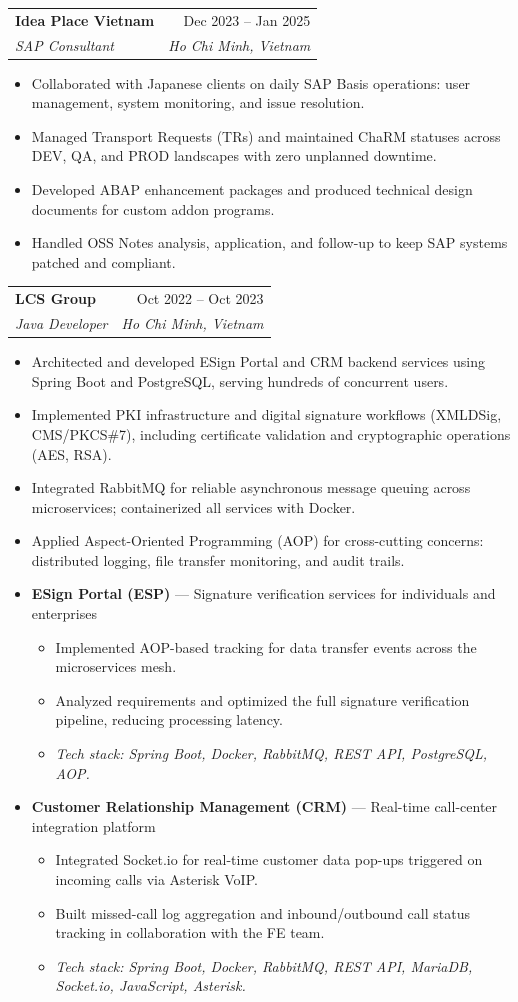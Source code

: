 \documentclass[letterpaper,11pt]{article}
\makeatletter
\newcommand{\resumeItem}[1]{
  \item\small{{#1\vspace{-1pt}}}
}
\newcommand{\resumeSubheading}[4]{
  \vspace{-2pt}\item
    \begin{tabular*}{0.97\textwidth}[t]{l@{\extracolsep{\fill}}r}
      \textbf{\small #1} & \small #2 \\
      \textit{\small\color{accent} #3} & \textit{\small #4} \\
    \end{tabular*}\vspace{-5pt}
}
\newcommand{\techStack}[1]{%
  \vspace{1pt}
  {\small\textit{Tech stack: #1}}%
}
\newcommand{\resumeItemListStart}{%
  \begin{itemize}[leftmargin=0.22in, topsep=2pt, parsep=0pt, partopsep=0pt, itemsep=2pt]%
}
\newcommand{\resumeItemListEnd}{\end{itemize}\vspace{-2pt}}
\newenvironment{projectBlock}[2]{%
  \vspace{-4pt}
  \begin{itemize}[leftmargin=0.22in, label={}, topsep=0pt, parsep=0pt, itemsep=0pt]
  \item \small\textbf{#1} --- #2
  \begin{itemize}[leftmargin=0.18in, topsep=1pt, parsep=0pt, itemsep=1pt]
}{%
  \end{itemize}
  \end{itemize}
  \vspace{-2pt}
}
\makeatother
\begin{document}
  \resumeSubheading
    {Idea Place Vietnam}{Dec 2023 -- Jan 2025}
    {SAP Consultant}{Ho Chi Minh, Vietnam}
  \resumeItemListStart
    \resumeItem{Collaborated with Japanese clients on daily SAP Basis operations: user management, system monitoring, and issue resolution.}
    \resumeItem{Managed Transport Requests (TRs) and maintained ChaRM statuses across DEV, QA, and PROD landscapes with zero unplanned downtime.}
    \resumeItem{Developed ABAP enhancement packages and produced technical design documents for custom addon programs.}
    \resumeItem{Handled OSS Notes analysis, application, and follow-up to keep SAP systems patched and compliant.}
  \resumeItemListEnd

  \resumeSubheading
    {LCS Group}{Oct 2022 -- Oct 2023}
    {Java Developer}{Ho Chi Minh, Vietnam}
  \resumeItemListStart
    \resumeItem{Architected and developed ESign Portal and CRM backend services using Spring Boot and PostgreSQL, serving hundreds of concurrent users.}
    \resumeItem{Implemented PKI infrastructure and digital signature workflows (XMLDSig, CMS/PKCS\#7), including certificate validation and cryptographic operations (AES, RSA).}
    \resumeItem{Integrated RabbitMQ for reliable asynchronous message queuing across microservices; containerized all services with Docker.}
    \resumeItem{Applied Aspect-Oriented Programming (AOP) for cross-cutting concerns: distributed logging, file transfer monitoring, and audit trails.}
  \resumeItemListEnd

  \begin{projectBlock}{ESign Portal (ESP)}{Signature verification services for individuals and enterprises}
    \resumeItem{Implemented AOP-based tracking for data transfer events across the microservices mesh.}
    \resumeItem{Analyzed requirements and optimized the full signature verification pipeline, reducing processing latency.}
    \item \techStack{Spring Boot, Docker, RabbitMQ, REST API, PostgreSQL, AOP.}
  \end{projectBlock}

  \begin{projectBlock}{Customer Relationship Management (CRM)}{Real-time call-center integration platform}
    \resumeItem{Integrated Socket.io for real-time customer data pop-ups triggered on incoming calls via Asterisk VoIP.}
    \resumeItem{Built missed-call log aggregation and inbound/outbound call status tracking in collaboration with the FE team.}
    \item \techStack{Spring Boot, Docker, RabbitMQ, REST API, MariaDB, Socket.io, JavaScript, Asterisk.}
  \end{projectBlock}
\end{document}
